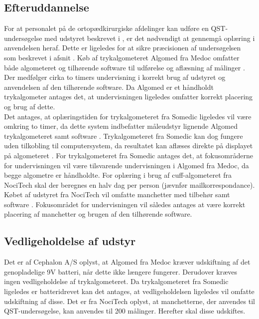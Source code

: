 \subsection{Efteruddannelse}
For at personalet på de ortopædkirurgiske afdelinger kan udføre en QST-undersøgelse med udstyret beskrevet i , er det nødvendigt at gennemgå oplæring i anvendelsen heraf. Dette er ligeledes for at sikre præcisionen af undersøgelsen som beskrevet i afsnit . Køb af trykalgometeret Algomed fra Medoc omfatter både algometeret og tilhørende software til udførelse og aflæsning af målinger \citep{AlgomedData}. Der medfølger cirka to timers undervisning i korrekt brug af udstyret og anvendelsen af den tilhørende software. Da Algomed er et håndholdt trykalgometer antages det, at undervisningen ligeledes omfatter korrekt placering og brug af dette. \\
Det antages, at oplæringstiden for trykalgometeret fra Somedic ligeledes vil være omkring to timer, da dette system indbefatter måleudstyr lignende Algomed trykalgometeret samt software \citep{SomedicSenselab2016}. Trykalgometeret fra Somedic kan dog fungere uden tilkobling til computersystem, da resultatet kan aflæses direkte på displayet på algometeret \citep{SomedicSenselab2016}. For trykalgometeret fra Somedic antages det, at fokusområderne for undervisningen vil være tilsvarende undervisningen i Algomed fra Medoc, da begge algometre er håndholdte.
For oplæring i brug af cuff-algometeret fra NociTech skal der beregnes en halv dag per person (jævnfør mailkorrespondance). Købet af udstyret fra NociTech vil omfatte manchetter med tilbehør samt software \citep{NociTech2016}. Fokusområdet for undervisningen vil således antages at være korrekt placering af manchetter og brugen af den tilhørende software.   

\subsection{Vedligeholdelse af udstyr}
Det er af Cephalon A/S oplyst, at Algomed fra Medoc kræver udskiftning af det genopladelige 9V batteri, når dette ikke længere fungerer. Derudover kræves ingen vedligeholdelse af trykalgometeret. Da trykalgometeret fra Somedic ligeledes er batteridrevet kan det antages, at vedligeholdelsen ligeledes vil omfatte udskiftning af disse. 
Det er fra NociTech oplyst, at manchetterne, der anvendes til QST-undersøgelse, kan anvendes til 200 målinger. Herefter skal disse udskiftes.

